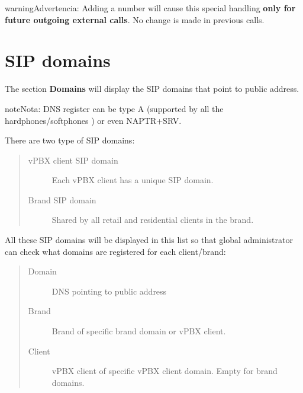 \documentclass[letterpaper,10pt,spanish]{sphinxmanual}
\begin{document}
\begin{notice}{warning}{Advertencia:}
Adding a number will cause this special handling \textbf{only for future outgoing external calls}.
No change is made in previous calls.
\end{notice}
\label{administration_portal/platform/sip_domains:god-sipdomains}

\section{SIP domains}
\label{administration_portal/platform/sip_domains:sip-domains}\label{administration_portal/platform/sip_domains::doc}\label{administration_portal/platform/sip_domains:god-sipdomains}\label{administration_portal/platform/sip_domains:id1}
The section \textbf{Domains} will display the SIP domains that point to {\hyperref[administration_portal/platform/infrastructure/proxy_users:proxyusers]{}} public address.

\begin{notice}{note}{Nota:}
DNS register can be type A (supported by all the hardphones/softphones
) or even NAPTR+SRV.
\end{notice}

There are two type of SIP domains:
\begin{quote}
\begin{description}
\item[{vPBX client SIP domain}] \leavevmode
Each vPBX client has a unique SIP domain.

\item[{Brand SIP domain}] \leavevmode
Shared by all retail and residential clients in the brand.

\end{description}
\end{quote}

All these SIP domains will be displayed in this list so that global administrator can check
what domains are registered for each client/brand:
\begin{quote}
\begin{description}
\item[{Domain}] \leavevmode
DNS pointing to {\hyperref[administration_portal/platform/infrastructure/proxy_users:proxyusers]{}} public address

\item[{Brand}] \leavevmode
Brand of specific brand domain or vPBX client.

\item[{Client}] \leavevmode
vPBX client of specific vPBX client domain. Empty for brand domains.

\end{description}
\end{quote}
\label{administration_portal/platform/portals:portals}
\end{document}
